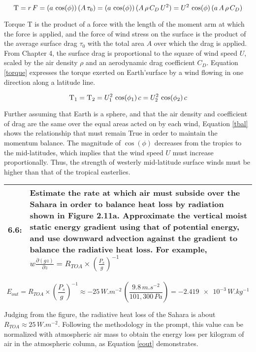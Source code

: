 \documentclass[12pt]{article}
\newcommand*{\problem}[2]{
    \begin{table}[ht]
    \centering
        \begin{tabular}{ | p{.1\linewidth} p{.9\linewidth} | }
            \hline
            \vspace{.3em}\textbf{\large#1:} & \vspace{.3em}\small{#2}\hspace{.2em}\vspace{.5em} \\ \hline
        \end{tabular}
    \end{table}
}
\begin{document}
\begin{equation}\label{torque}
    \text{\textsc{T}} = r \, F = (a \, \cos(\phi)) \, (A \, \tau_0) = (a \, \cos(\phi)) \, (A \,\rho \, C_D \, U^2) = U^2 \, \cos(\phi) \, (a \, A \, \rho \, C_D )
\end{equation}

Torque \textsc{T} is the product of a force with the length of the moment arm at which the force is applied, and the force of wind stress on the surface is the product of the average surface drag $\tau_0$ with the total area $A$ over which the drag is applied. From Chapter 4, the surface drag is proportional to the square of wind speed $U$, scaled by the air density $\rho$ and an aerodynamic drag coefficient $C_D$. Equation \ref{torque} expresses the torque exerted on Earth'surface by a wind flowing in one direction along a latitude line.

\begin{equation}\label{tbal}
    \text{\textsc{T}}_1 = \text{\textsc{T}}_2 = U_1^2 \, \cos(\phi_1) \, c = U_2^2 \, \cos(\phi_2) \, c
\end{equation}

Further assuming that Earth is a sphere, and that the air density and coefficient of drag are the same over the equal areas acted on by each wind, Equation \ref{tbal} shows the relationship that must remain True in order to maintain the momentum balance. The magnitude of $\cos(\phi)$ decreases from the tropics to the mid-latitudes, which implies that the wind speed $U$ must increase proportionally. Thus, the strength of westerly mid-latitude surface winds must be higher than that of the tropical easterlies.

\problem{6.6}{
    Estimate the rate at which air must subside over the Sahara in order to balance heat loss by radiation shown in Figure 2.11a. Approximate the vertical moist static energy gradient using that of potential energy, and use downward advection against the gradient to balance the radiative heat loss. For example, $w \frac{\partial(gz)}{\partial z} = R_{TOA} \times \left(\frac{P_s}{g}\right)^{-1}$
} %

\begin{equation}\label{eout}
    E_{out} = R_{TOA} \times \left(\frac{P_s}{g}\right)^{-1} \approx -25\,\si{W.m^{-2}}\,\left(\frac{9.8\,\si{m.s^{-2}}}{101,300\,\si{Pa}}\right) = \num{-2.419e-3} \,\si{W.kg^{-1}}
\end{equation}

Judging from the figure, the radiative heat loss of the Sahara is about $R_{TOA} \approx 25\,\si{W.m^{-2}}$. Following the methodology in the prompt, this value can be normalized with atmospheric air mass to obtain the energy loss per kilogram of air in the atmospheric column, as Equation \ref{eout} demonstrates.
\end{document}
